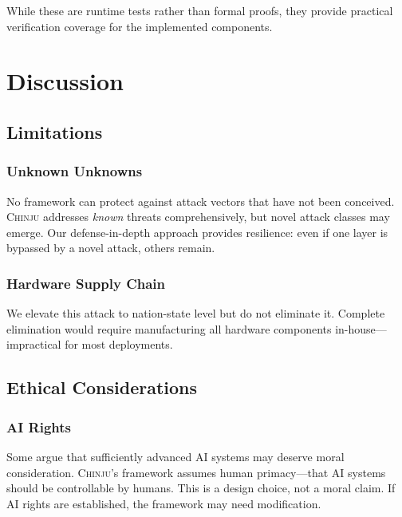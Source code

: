 \documentclass[11pt,a4paper]{article}
\newcommand{\chinju}{\textsc{Chinju}}
\begin{document}
While these are runtime tests rather than formal proofs, they provide practical verification coverage for the implemented components.

\section{Discussion}
\label{sec:discussion}

\subsection{Limitations}

\subsubsection{Unknown Unknowns}

No framework can protect against attack vectors that have not been conceived.
\chinju{} addresses \emph{known} threats comprehensively, but novel attack classes may emerge.
Our defense-in-depth approach provides resilience: even if one layer is bypassed by a novel attack, others remain.

\subsubsection{Hardware Supply Chain}

We elevate this attack to nation-state level but do not eliminate it.
Complete elimination would require manufacturing all hardware components in-house---impractical for most deployments.

\subsection{Ethical Considerations}

\subsubsection{AI Rights}

Some argue that sufficiently advanced AI systems may deserve moral consideration.
\chinju{}'s framework assumes human primacy---that AI systems should be controllable by humans.
This is a design choice, not a moral claim.
If AI rights are established, the framework may need modification.
\end{document}

